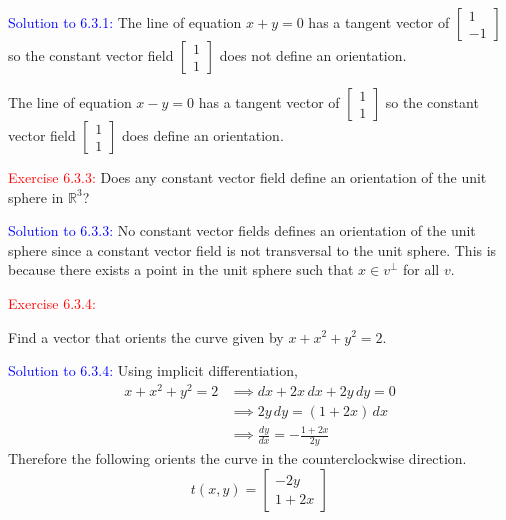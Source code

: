 \documentclass[12pt]{article}
\begin{document}
{\textcolor{blue}{Solution to 6.3.1:}
    The line of equation $x+y=0$ has a tangent vector of 
    $\begin{bmatrix}
        1 \\ -1
    \end{bmatrix}$
    so the constant vector field
    $\begin{bmatrix}
        1 \\ 1
    \end{bmatrix}$
    does not define an orientation.

    The line of equation $x-y=0$ has a tangent vector of 
    $\begin{bmatrix}
        1 \\ 1
    \end{bmatrix}$
    so the constant vector field
    $\begin{bmatrix}
        1 \\ 1
    \end{bmatrix}$
    does define an orientation.
\newpage

\textcolor{red}{Exercise 6.3.3:}
Does any constant vector field define an orientation of the unit sphere in $\mathbb{R}^3$?
\smallskip

\textcolor{blue}{Solution to 6.3.3:}
    No constant vector fields defines an orientation of the unit sphere since
    a constant vector field is not transversal to the unit sphere.
    This is because there exists a point in the unit sphere 
    such that $x \in v^\perp$ for all $v$.

\newpage

\textcolor{red}{Exercise 6.3.4:}

Find a vector that orients the curve given by
$x+x^2+y^2 =2$.
\smallskip



\textcolor{blue}{Solution to 6.3.4:}
    Using implicit differentiation,
    \begin{align*}
        x + x^2 + y^2 = 2
        &\implies dx + 2x\,dx + 2y\,dy = 0 \\
        &\implies 2y\,dy = (1+2x)\,dx \\
        &\implies \frac{dy}{dx} = -\frac{1+2x}{2y}
    \end{align*}
    Therefore the following orients the curve in the counterclockwise direction.
    \[
        t(x,y) = 
        \begin{bmatrix}
            -2y \\
            1+2x
        \end{bmatrix}
    \]

}
\end{document}
